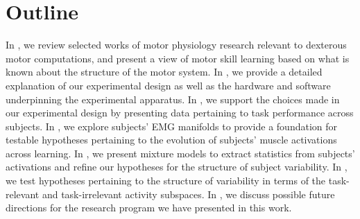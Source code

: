 \documentclass[../main.tex]{subfiles}
\begin{document}
\section{Outline}

In , we review selected works of motor physiology research relevant to dexterous motor computations, and present a view of motor skill learning based on what is known about the structure of the motor system. In , we provide a detailed explanation of our experimental design as well as the hardware and software underpinning the experimental apparatus. In , we support the choices made in our experimental design by presenting data pertaining to task performance across subjects. In , we explore subjects' EMG manifolds to provide a foundation for testable hypotheses pertaining to the evolution of subjects' muscle activations across learning. In , we present mixture models to extract statistics from subjects' activations and refine our hypotheses for the structure of subject variability. In , we test hypotheses pertaining to the structure of variability in terms of the task-relevant and task-irrelevant activity subspaces. In , we discuss possible future directions for the research program we have presented in this work.


\cleardoublepage\printendnotes%
\ifSubfilesClassLoaded{%
    \newpage%
}{}%
\end{document}
